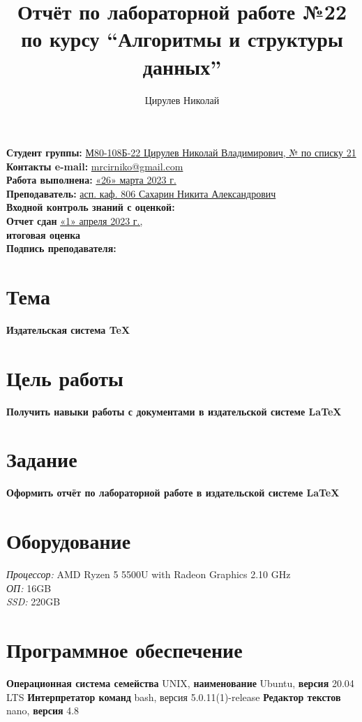 \documentclass[12pt, letterpaper]{article}
\title{Отчёт по лабораторной работе №22 по курсу “Алгоритмы и структуры данных”}
\author{Цирулев Николай}
\begin{document}
\maketitle
\begin{description}
\textbf{Студент группы:} \underline{М80-108Б-22 Цирулев Николай Владимирович, № по списку 21}\\
\textbf{Контакты e-mail:} \underline{mrcirniko@gmail.com}\\
\textbf{Работа выполнена:} \underline{«26» марта 2023 г.}\\
\textbf{Преподаватель:} \underline{асп. каф. 806 Сахарин Никита Александрович}\\
\textbf{Входной контроль знаний с оценкой:}\\
\textbf{Отчет сдан} \underline{«1» апреля 2023 г.,}\\ \textbf{итоговая оценка}\\
\textbf{Подпись преподавателя:} \underline{\hspace{3cm}}\\
\end{description}
\section{Тема}
\textbf{Издательская система \TeX}
\section{Цель работы}
\textbf{Получить навыки работы с документами в издательской системе \LaTeX}
\section{Задание}
\textbf{Оформить отчёт по лабораторной работе в издательской системе \LaTeX}
\section{Оборудование}
\textit {Процессор:} AMD Ryzen 5 5500U with Radeon Graphics 2.10 GHz\\
\textit{ОП:} 16GB\\
\textit {SSD:} 220GB
\section{Программное обеспечение}
\textbf{Операционная система семейства} UNIX, \textbf{наименование} Ubuntu, \textbf{версия} 20.04 LTS \textbf{Интерпретатор команд} bash, версия 5.0.11(1)-release \textbf{Редактор текстов} nano, \textbf{версия} 4.8
\end{document}
